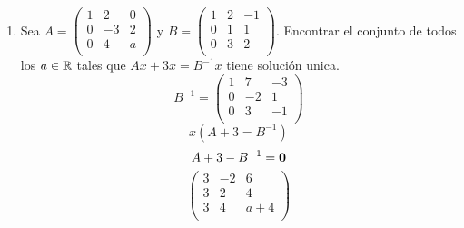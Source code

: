 \documentclass[../practica.root.tex]{subfiles}
\begin{document}
\begin{enumerate}
    \item Sea \(A = \begin{pmatrix}
              1 & 2  & 0 \\
              0 & -3 & 2 \\
              0 & 4  & a \\
          \end{pmatrix}\) y \(B = \begin{pmatrix}
              1 & 2 & -1 \\
              0 & 1 & 1  \\
              0 & 3 & 2  \\
          \end{pmatrix}\). Encontrar el conjunto de todos los \( a \in \mathbb{R} \) tales que \( Ax + 3x = B^{-1}x \) tiene solución unica.
          \[
              B^{-1} = \begin{pmatrix}
                  1 & 7  & -3 \\
                  0 & -2 & 1  \\
                  0 & 3  & -1 \\
              \end{pmatrix}
          \] \[
              x(A + 3 = B^{-1})
          \] \[
              A + 3 - B^{-1} = \mathbf{0}
          \] \[
              \begin{pmatrix}
                  3 & -2 & 6   \\
                  3 & 2  & 4   \\
                  3 & 4  & a+4 \\
              \end{pmatrix}
          \]


\end{enumerate}
\end{document}
